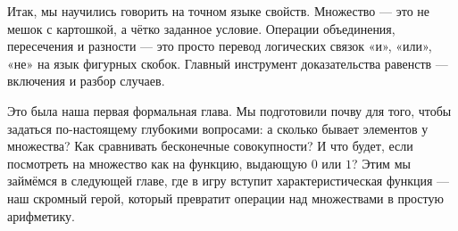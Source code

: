Итак, мы научились говорить на точном языке свойств. Множество — это не мешок с картошкой, а чётко заданное условие. Операции объединения, пересечения и разности — это просто перевод логических связок «и», «или», «не» на язык фигурных скобок. Главный инструмент доказательства равенств — включения и разбор случаев.

Это была наша первая формальная глава. Мы подготовили почву для того, чтобы задаться по-настоящему глубокими вопросами: а сколько бывает элементов у множества? Как сравнивать бесконечные совокупности? И что будет, если посмотреть на множество как на функцию, выдающую $0$ или $1$? Этим мы займёмся в следующей главе, где в игру вступит характеристическая функция — наш скромный герой, который превратит операции над множествами в простую арифметику.